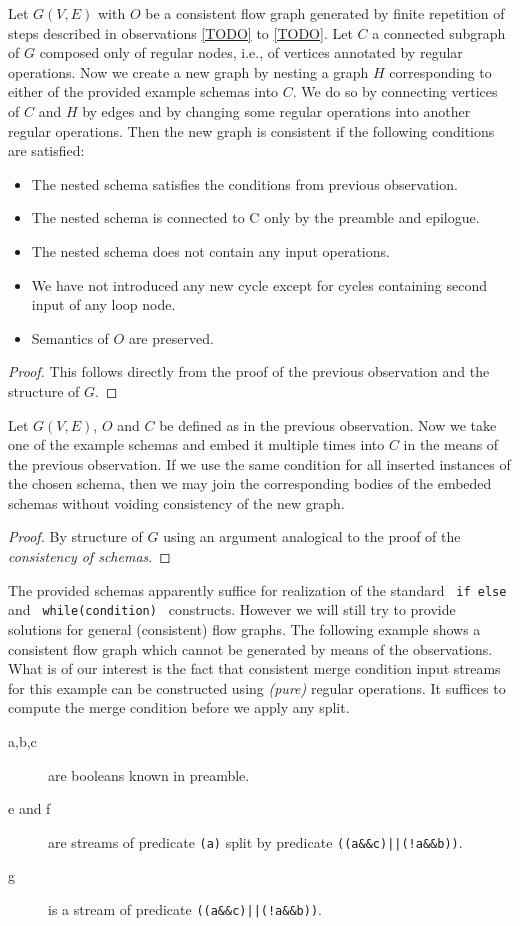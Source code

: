 \begin{observation}
  Let $G(V,E)$ with $O$ be a consistent flow graph generated by finite repetition of steps described in observations \ref{TODO} to \ref{TODO}. Let $C$ a connected subgraph of $G$ composed only of regular nodes, i.e., of vertices annotated by regular operations. Now we create a new graph by nesting a graph $H$ corresponding to either of the provided example schemas into $C$. We do so by connecting vertices of $C$ and $H$ by edges and by changing some regular operations into another regular operations. Then the new graph is consistent if the following conditions are satisfied:
  \begin{itemize}
    \item The nested schema satisfies the conditions from previous observation.
    \item The nested schema is connected to C only by the preamble and epilogue.
    \item The nested schema does not contain any input operations. 
    \item We have not introduced any new cycle except for cycles containing second input of any loop node.
    \item Semantics of $O$ are preserved.
  \end{itemize}
  \begin{proof} 
    This follows directly from the proof of the previous observation and the structure of $G$.
  \end{proof}
\end{observation}

\begin{observation}
  Let $G(V,E)$, $O$ and $C$ be defined as in the previous observation. Now we take one of the example schemas and embed it multiple times into $C$ in the means of the previous observation. If we use the same condition for all inserted instances of the chosen schema, then we may join the corresponding bodies of the embeded schemas without voiding consistency of the new graph.
  \begin{proof} 
    By structure of $G$ using an argument analogical to the proof of the \emph{consistency of schemas}.
  \end{proof}
\end{observation}


The provided schemas apparently suffice for realization of the standard \texttt{ if \string{\string} else \string{\string} } and \texttt{ while(condition) \string{\string} } constructs. However we will still try to provide solutions for general (consistent) flow graphs. The following example shows a consistent flow graph which cannot be generated by means of the observations. What is of our interest is the fact that consistent merge condition input streams for this example can be constructed using \emph{(pure)} regular operations. It suffices to compute the merge condition before we apply any split.


\begin{description}
  \item[a,b,c] are booleans known in preamble.
  \item[e and f] are streams of predicate \texttt{(a)} split by predicate \texttt{((a\&\&c)||(!a\&\&b))}.
  \item[g] is a stream of predicate \texttt{((a\&\&c)||(!a\&\&b))}.
\end{description}



